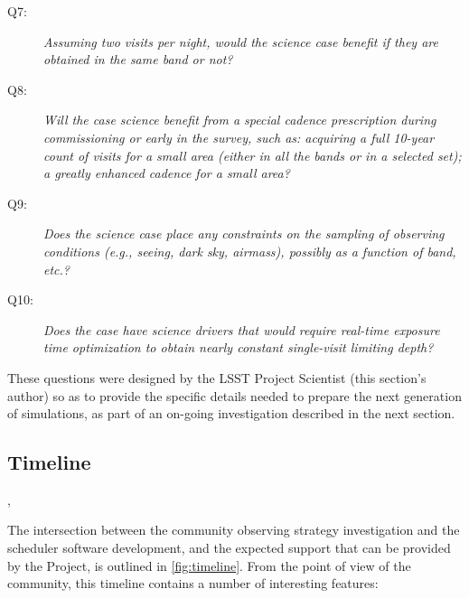 \begin{description}

\item[Q7:] {\it Assuming two visits per night, would the science case
benefit if they are obtained in the same band or not?}


\item[Q8:] {\it Will the case science benefit from a special cadence
prescription during commissioning or early in the survey, such as:
acquiring a full 10-year count of visits for a small area (either in all
the bands or in a  selected set); a greatly enhanced cadence for a small
area?}


\item[Q9:] {\it Does the science case place any constraints on the
sampling of observing conditions (e.g., seeing, dark sky, airmass),
possibly as a function of band, etc.?}


\item[Q10:] {\it Does the case have science drivers that would require
real-time exposure time optimization to obtain nearly constant
single-visit limiting depth?}


\end{description}

These questions were designed by the LSST Project Scientist (this section's author) so as to provide the specific details needed to prepare the next generation of \OpSim simulations, as part of an on-going investigation described in the next section.

\navigationbar



\subsection{Timeline}
\def\secname{intro:timeline}\label{sec:\secname}

,

The intersection between the community observing strategy investigation and the scheduler software development,
and the expected support that can be provided by the Project, is
outlined in \autoref{fig:timeline}. From the point of view of the community, this timeline contains a number of interesting features:


